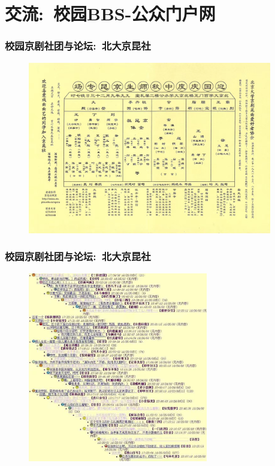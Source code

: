 \documentclass[cjk,slidestop,compress,mathserif,blue]{beamer}
\begin{document}
\small
\section{交流:~校园\rm{BBS}-公众门户网}
\frame
{
	\frametitle{校园京剧社团与论坛:~北大京昆社}
\begin{figure}[h!]
\centering
\vspace{-0.1in}
\includegraphics[height=0.70\textwidth,width=0.95\textwidth,clip]{Figures_Peking-Opera/PekOpe_PKU-1.jpg}
\label{PKU-1}
\end{figure}
}

\frame
{
	\frametitle{校园京剧社团与论坛:~北大京昆社}
\begin{figure}[h!]
\centering
\vspace{-0.2in}
\includegraphics[height=0.75\textwidth,width=0.70\textwidth,clip]{Figures_Peking-Opera/PekOpe_PKU-2.jpg}
\label{PKU-2}
\end{figure}
}
\end{document}
